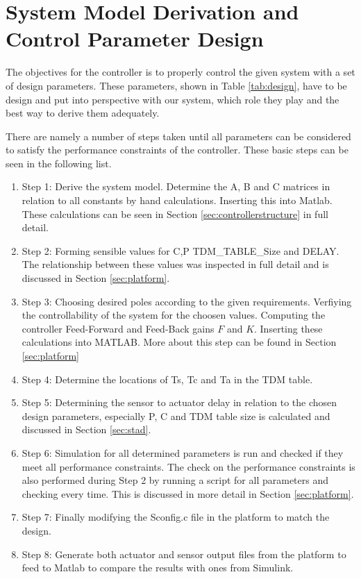\section{System Model Derivation and Control Parameter Design}
The objectives for the controller is to properly control the given system with a set of design parameters. These parameters, shown in Table \ref{tab:design}, have to be design and put into perspective with our system, which role they play and the best way to derive them adequately.

There are namely a number of steps taken until all parameters can be considered to satisfy the performance constraints of the controller. These basic steps can be seen in the following list.

\begin{enumerate}
	\item Step 1: Derive the system model. Determine the A, B and C matrices in relation to all constants by hand calculations. Inserting this into Matlab. These calculations can be seen in Section \ref{sec:controllerstructure} in full detail.
	\item Step 2: Forming sensible values for C,P TDM\_TABLE\_Size and DELAY. The relationship between these values was inspected in full detail and is discussed in Section \ref{sec:platform}.
	\item Step 3: Choosing desired poles according to the given requirements. Verfiying the controllability of the system for the choosen values. Computing the controller Feed-Forward and Feed-Back gains $F$ and $K$. Inserting these calculations into MATLAB. More about this step can be found in Section \ref{sec:platform}
	\item Step 4: Determine the locations of Ts, Tc and Ta in the TDM table.
	\item Step 5: Determining the sensor to actuator delay in relation to the chosen design parameters, especially P, C and TDM table size is calculated and discussed in Section \ref{sec:stad}. 
	\item Step 6: Simulation for all determined parameters is run and checked if they meet all performance constraints. The check on the performance constraints is also performed during Step 2 by running a script for all parameters and checking every time. This is discussed in more detail in Section \ref{sec:platform}.
	\item Step 7: Finally modifying the Sconfig.c file in the platform to match the design.
	\item Step 8: Generate both actuator and sensor output files from the platform to feed to Matlab to compare the results with ones from Simulink.
\end{enumerate}


